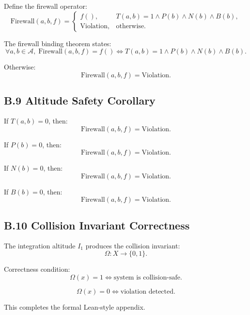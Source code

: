 Define the firewall operator:
\[
\mathrm{Firewall}(a,b,f) =
\begin{cases}
f(), & T(a,b)=1 \land P(b) \land N(b) \land B(b), \\
\mathrm{Violation}, & \text{otherwise}.
\end{cases}
\]

The firewall binding theorem states:
\[
\forall a,b \in \mathcal{A},\;
\mathrm{Firewall}(a,b,f) = f()
\iff
T(a,b)=1 \land P(b) \land N(b) \land B(b).
\]

Otherwise:
\[
\mathrm{Firewall}(a,b,f) = \mathrm{Violation}.
\]

\subsection*{B.9 Altitude Safety Corollary}

If $T(a,b)=0$, then:
\[
\mathrm{Firewall}(a,b,f) = \mathrm{Violation}.
\]

If $P(b)=0$, then:
\[
\mathrm{Firewall}(a,b,f) = \mathrm{Violation}.
\]

If $N(b)=0$, then:
\[
\mathrm{Firewall}(a,b,f) = \mathrm{Violation}.
\]

If $B(b)=0$, then:
\[
\mathrm{Firewall}(a,b,f) = \mathrm{Violation}.
\]

\subsection*{B.10 Collision Invariant Correctness}

The integration altitude $I_1$ produces the collision invariant:
\[
\Omega : X \to \{0,1\}.
\]

Correctness condition:
\[
\Omega(x)=1 \iff \text{system is collision-safe}.
\]

\[
\Omega(x)=0 \iff \text{violation detected}.
\]

This completes the formal Lean-style appendix.
